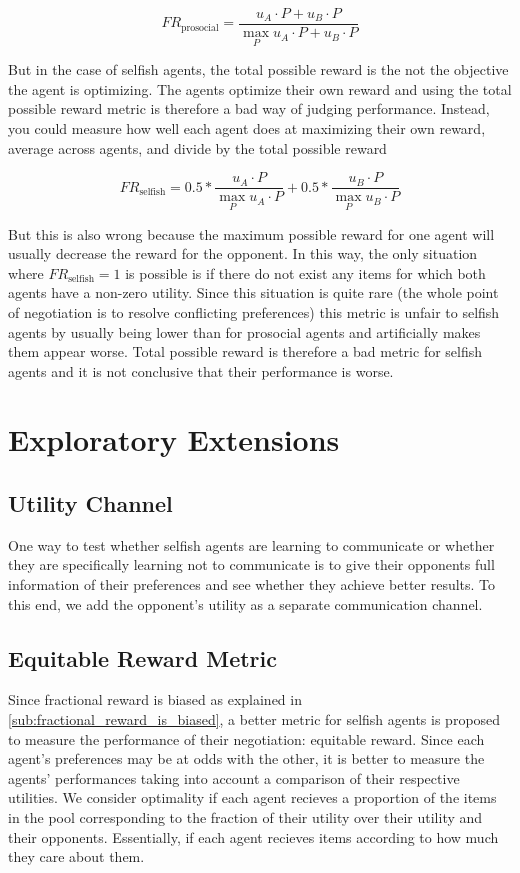 \documentclass{article}
\begin{document}
\begin{equation}
    FR_{\text{prosocial}} = \frac{u_A \cdot P + u_B \cdot P}{\max_P u_A \cdot P + u_B \cdot P}
\end{equation}

But in the case of selfish agents, the total possible reward is the not the
objective the agent is optimizing. The agents optimize their own reward and
using the total possible reward metric is therefore a bad way of judging
performance. Instead, you could measure how well each agent does at maximizing
their own reward, average across agents, and divide by the total possible reward

\begin{equation}
    FR_{\text{selfish}} = 0.5 * \frac{u_A \cdot P}{\max_P u_A \cdot P} + 0.5 * \frac{u_B \cdot P}{\max_P u_B \cdot P}
\end{equation}

But this is also wrong because the maximum possible reward for one agent will
usually decrease the reward for the opponent. In this way, the only situation where
$FR_{\text{selfish}} = 1$ is possible is if there do not exist any items for
which both agents have a non-zero utility. Since this situation is quite rare
(the whole point of negotiation is to resolve conflicting preferences) this
metric is unfair to selfish agents by usually being lower than for prosocial
agents and artificially makes them appear worse. Total possible reward is
therefore a bad metric for selfish agents and it is not conclusive that their
performance is worse.


\section{Exploratory Extensions}%
\label{sec:exploratory_experiments}

\subsection{Utility Channel}%
\label{sub:preferences_channel}
One way to test whether selfish agents are learning to communicate or whether
they are specifically learning not to communicate is to give their opponents
full information of their preferences and see whether they achieve better
results. To this end, we add the opponent's utility as a separate communication
channel.

\subsection{Equitable Reward Metric}%
\label{sub:equitable_reward_metric}
Since fractional reward is biased as explained in
\ref{sub:fractional_reward_is_biased}, a better metric for selfish agents is
proposed to measure the performance of their negotiation: equitable reward.
Since each agent's preferences may be at odds with the other, it is better to
measure the agents' performances taking into account a comparison of their
respective utilities. We consider optimality if each agent recieves a proportion
of the items in the pool corresponding to the fraction of their utility over
their utility and their opponents. Essentially, if each agent recieves items
according to how much they care about them.
\end{document}
